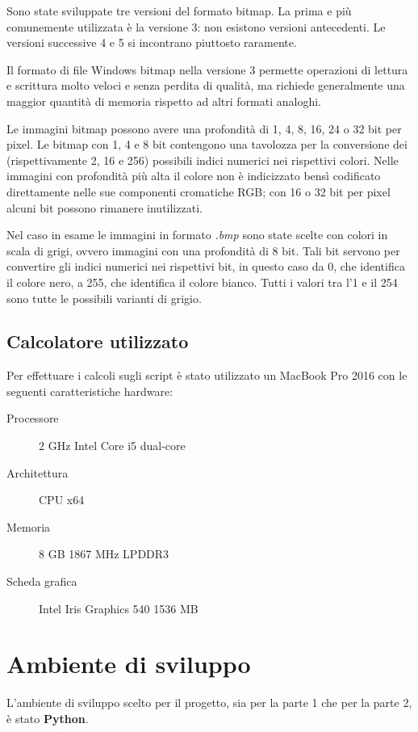 \documentclass[preprint,12pt]{elsarticle}
\begin{document}
Sono state sviluppate tre versioni del formato bitmap. La prima e più comunemente utilizzata è la versione 3: non esistono versioni antecedenti. Le versioni successive 4 e 5 si incontrano piuttosto raramente.

Il formato di file Windows bitmap nella versione 3 permette operazioni di lettura e scrittura molto veloci e senza perdita di qualità, ma richiede generalmente una maggior quantità di memoria rispetto ad altri formati analoghi.

Le immagini bitmap possono avere una profondità di 1, 4, 8, 16, 24 o 32 bit per pixel. Le bitmap con 1, 4 e 8 bit contengono una tavolozza per la conversione dei (rispettivamente 2, 16 e 256) possibili indici numerici nei rispettivi colori. Nelle immagini con profondità più alta il colore non è indicizzato bensì codificato direttamente nelle sue componenti cromatiche RGB; con 16 o 32 bit per pixel alcuni bit possono rimanere inutilizzati.

Nel caso in esame le immagini in formato \textit{.bmp} sono state scelte con colori in scala di grigi, ovvero immagini con una profondità di 8 bit. Tali bit servono per convertire gli indici numerici nei rispettivi bit, in questo caso da 0, che identifica il colore nero, a 255, che identifica il colore bianco. Tutti i valori tra l'1 e il 254 sono tutte le possibili varianti di grigio.

\subsection{Calcolatore utilizzato}
Per effettuare i calcoli sugli script è stato utilizzato un MacBook Pro 2016 con le seguenti caratteristiche hardware:
\begin{description}
\item[Processore] 2 GHz Intel Core i5 dual-core
\item[Architettura] CPU x64
\item[Memoria] 8 GB 1867 MHz LPDDR3
\item[Scheda grafica] Intel Iris Graphics 540 1536 MB
\end{description}

\newpage

\section{Ambiente di sviluppo}

L'ambiente di sviluppo scelto per il progetto, sia per la parte 1 che per la parte 2, è stato \textbf{Python}.
\end{document}

